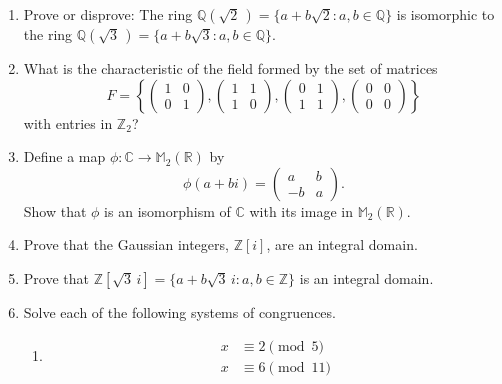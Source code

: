 {\begin{enumerate}
 
\item
Prove or disprove: The ring ${\mathbb Q}( \sqrt{2}\, ) = \{ a + b \sqrt{2}
: a, b \in {\mathbb Q} \}$ is isomorphic to the ring ${\mathbb Q}( \sqrt{3}\,
) = \{a + b \sqrt{3} : a, b \in {\mathbb Q}  \}$.
 
 
\item
What is the characteristic of the field formed by the set of matrices
\[
F
=
\left\{
\begin{pmatrix}
1 & 0 \\
0 & 1
\end{pmatrix},
\begin{pmatrix}
1 & 1 \\
1 & 0
\end{pmatrix},
\begin{pmatrix}
0 & 1 \\
1 & 1
\end{pmatrix},
\begin{pmatrix}
0 & 0 \\
0 & 0
\end{pmatrix}
\right\}
\]
with entries in ${\mathbb Z}_2$?
 
 
\item
Define a map $\phi : {\mathbb C} \rightarrow {\mathbb M}_2 ({\mathbb R})$ by
\[
\phi( a + bi) =
\begin{pmatrix}
a & b \\
-b & a
\end{pmatrix}.
\]
Show that $\phi$ is an isomorphism of ${\mathbb C}$ with its image in
${\mathbb M}_2 ({\mathbb R})$.
 
 
 
\item
Prove that the Gaussian integers, ${\mathbb Z}[i ]$, are an integral
domain. 
 
 
 
\item
Prove that  ${\mathbb Z}[ \sqrt{3}\, i ] = \{ a + b \sqrt{3}\, i : a, b \in
{\mathbb Z} \}$ is an integral domain.
 
 
\item
Solve each of the following systems of congruences.
\begin{multicols}{2}
\begin{enumerate}

\item
\begin{align*}
x & \equiv  2 \pmod{5} \\
x & \equiv  6 \pmod{11}
\end{align*}


\end{enumerate}
\end{multicols}
\end{enumerate}}
